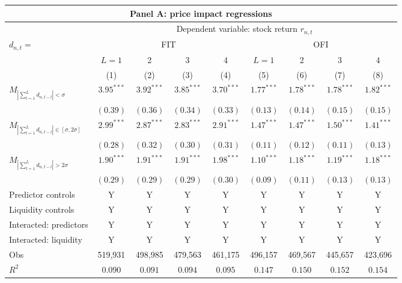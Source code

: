 \begin{tabular}{lcccccccc}
  \hline \multicolumn{9}{c}{Panel A: price impact regressions} \\
 \hline
    & \multicolumn{8}{c}{Dependent variable: stock return $r_{n,t}$} \\

    \cmidrule(l){2-9} $d_{n,t} = $ & \multicolumn{4}{c}{FIT} & \multicolumn{4}{c}{OFI} \\
 \cmidrule(l){2-5} \cmidrule(l){6-9} 
  & $L=1$ & 2 & 3 & 4 & $L=1$ & 2 & 3 & 4 \\ 
   \cmidrule(l){2-5} \cmidrule(l){6-9} 
 \vspace{5pt}
 & (1) & (2) & (3) & (4) & (5) & (6) & (7) & (8) \\ 
  $M_{\left|\sum_{l=1}^L d_{n,t-l}\right| < \sigma}$ & $3.95^{***}$ & $3.92^{***}$ & $3.85^{***}$ & $3.70^{***}$ & $1.77^{***}$ & $1.78^{***}$ & $1.78^{***}$ & $1.82^{***}$ \\ 
   & $(0.39)$ & $(0.36)$ & $(0.34)$ & $(0.33)$ & $(0.13)$ & $(0.14)$ & $(0.15)$ & $(0.15)$ \\ 
  $M_{\left|\sum_{l=1}^L d_{n,t-l}\right| \in [\sigma, 2\sigma]}$ & $2.99^{***}$ & $2.87^{***}$ & $2.83^{***}$ & $2.91^{***}$ & $1.47^{***}$ & $1.47^{***}$ & $1.50^{***}$ & $1.41^{***}$ \\ 
   & $(0.28)$ & $(0.32)$ & $(0.30)$ & $(0.31)$ & $(0.11)$ & $(0.12)$ & $(0.11)$ & $(0.13)$ \\ 
  $M_{\left|\sum_{l=1}^L d_{n,t-l}\right| > 2 \sigma}$ & $1.90^{***}$ & $1.91^{***}$ & $1.91^{***}$ & $1.98^{***}$ & $1.10^{***}$ & $1.18^{***}$ & $1.19^{***}$ & $1.18^{***}$ \\ 
   \vspace{5pt}
 & $(0.29)$ & $(0.29)$ & $(0.29)$ & $(0.30)$ & $(0.09)$ & $(0.11)$ & $(0.13)$ & $(0.13)$ \\ 
  Predictor controls & Y & Y & Y & Y & Y & Y & Y & Y \\ 
  Liquidity controls & Y & Y & Y & Y & Y & Y & Y & Y \\ 
  Interacted: predictors & Y & Y & Y & Y & Y & Y & Y & Y \\ 
   \vspace{5pt}
Interacted: liquidity & Y & Y & Y & Y & Y & Y & Y & Y \\ 
  Obs & 519,931 & 498,985 & 479,563 & 461,175 & 496,157 & 469,567 & 445,657 & 423,696 \\ 
  $R^2$ & $0.090$ & $0.091$ & $0.094$ & $0.095$ & $0.147$ & $0.150$ & $0.152$ & $0.154$ \\ 

\end{tabular}
